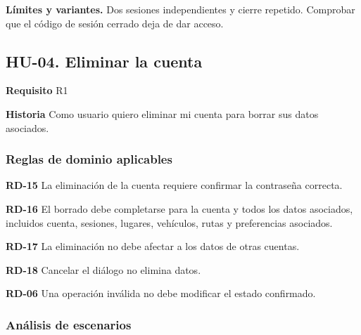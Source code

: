 {\fontsize{9}{11.8}\selectfont\textbf{Límites y variantes.} Dos sesiones independientes y cierre repetido. Comprobar que el código de sesión cerrado deja de dar acceso.\par}\vspace{4pt}
\clearpage\subsection*{HU-04. Eliminar la cuenta}

\textbf{Requisito} R1\par

\textbf{Historia} Como usuario quiero eliminar mi cuenta para borrar sus datos asociados.\par

\subsubsection*{Reglas de dominio aplicables}

\textbf{RD-15} La eliminación de la cuenta requiere confirmar la contraseña correcta.\par

\textbf{RD-16} El borrado debe completarse para la cuenta y todos los datos asociados, incluidos cuenta, sesiones, lugares, vehículos, rutas y preferencias asociados.\par

\textbf{RD-17} La eliminación no debe afectar a los datos de otras cuentas.\par

\textbf{RD-18} Cancelar el diálogo no elimina datos.\par

\textbf{RD-06} Una operación inválida no debe modificar el estado confirmado.\par

\subsubsection*{Análisis de escenarios}

